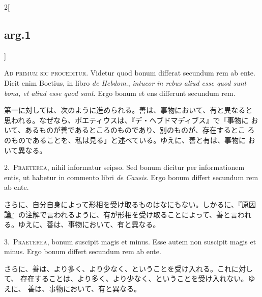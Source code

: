 \documentclass[paper=a4paper,fontsize=10pt,jafontsize=9pt,titlepage]{jlreq}
\begin{document}
\begin{paracol}{2}[\subsection{arg.1}]

{\huge A}{\scshape d primum sic proceditur}. Videtur quod bonum
differat secundum rem ab ente. Dicit enim Boetius, in libro {\itshape
de Hebdom}., {\itshape intueor in rebus aliud esse quod sunt bona, et
aliud esse quod sunt}. Ergo bonum et ens differunt secundum rem.

\switchcolumn

第一に対しては、次のように進められる。善は、事物において、有と異なると
思われる。なぜなら、ボエティウスは、『デ・ヘブドマディブス』で「事物に
おいて、あるものが善であるところのものであり、別のものが、存在するとこ
ろのものであることを、私は見る」と述べている。ゆえに、善と有は、事物に
おいて異なる。


2.~{\scshape Praeterea}, nihil informatur seipso. Sed bonum dicitur
per informationem entis, ut habetur in commento libri {\itshape de
Causis}. Ergo bonum differt secundum rem ab ente.

\switchcolumn

さらに、自分自身によって形相を受け取るものはなにもない。しかるに、『原因
 論』の注解で言われるように、有が形相を受け取ることによって、善と言われ
 る。ゆえに、善は、事物において、有と異なる。


3.~{\scshape Praeterea}, bonum suscipit magis et minus. Esse autem non
 suscipit magis et minus. Ergo bonum differt secundum rem ab ente.

\switchcolumn

さらに、善は、より多く、より少なく、ということを受け入れる。これに対して、
 存在することは、より多く、より少なく、ということを受け入れない。ゆえに、
 善は、事物において、有と異なる。

\switchcolumn*[\subsection{s.c.}]


\end{paracol}
\end{document}
